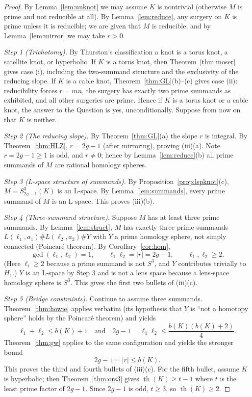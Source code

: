 \documentclass[11pt]{amsart}
\theoremstyle{definition}
\theoremstyle{remark}
\numberwithin{equation}{section}
\begin{document}
\begin{proof}
By Lemma~\ref{lem:unknot} we may assume $K$ is nontrivial (otherwise $M$
is prime and not reducible at all). By Lemma~\ref{lem:reduce}, any
surgery on $K$ is prime unless it is reducible; we are given that $M$ is
reducible, and by Lemma~\ref{lem:mirror} we may take $r>0$.

\noindent\emph{Step 1 (Trichotomy).} By Thurston's classification a knot
is a torus knot, a satellite knot, or hyperbolic. If $K$ is a torus knot,
then Theorem~\ref{thm:moser} gives case (i), including the two-summand
structure and the exclusivity of the reducing slope. If $K$ is a cable
knot, Theorem~\ref{thm:GL}(b)--(c) gives case (ii): reducibility forces
$r=mn$, the surgery has exactly two prime summands as exhibited, and all
other surgeries are prime. Hence if $K$ is a torus knot or a cable knot,
the answer to the Question is yes, unconditionally. Suppose from now on
that $K$ is neither.

\noindent\emph{Step 2 (The reducing slope).} By
Theorem~\ref{thm:GL}(a) the slope $r$ is integral. By
Theorem~\ref{thm:HLZ}, $r=2g-1$ (after mirroring), proving (iii)(a). Note
$r=2g-1\ge1$ is odd, and $r\neq0$; hence by
Lemma~\ref{lem:reduce}(b) all prime summands of $M$ are rational homology
spheres.

\noindent\emph{Step 3 (L-space structure of summands).} By
Proposition~\ref{prop:lspknot}(c), $M=S^{3}_{2g-1}(K)$ is an L-space. By
Lemma~\ref{lem:summands}, every prime summand of $M$ is an L-space. This
proves (iii)(b).

\noindent\emph{Step 4 (Three-summand structure).} Suppose $M$ has at
least three prime summands. By Lemma~\ref{lem:struct}, $M$ has exactly
three prime summands
$L(\ell_{1},a_{1})\#L(\ell_{2},a_{2})\#Y$ with $Y$ a prime homology
sphere, not simply connected (Poincar\'e theorem). By
Corollary~\ref{cor:hom},
\[
\gcd(\ell_{1},\ell_{2})=1,\qquad
\ell_{1}\ell_{2}=|r|=2g-1,\qquad \ell_{1},\ell_{2}\ge2 .
\]
(Here $\ell_{i}\ge2$ because a prime summand is not $S^{3}$, and $Y$
contributes trivially to $H_{1}$.) $Y$ is an L-space by Step 3 and is not
a lens space because a lens-space homology sphere is $S^{3}$. This gives
the first two bullets of (iii)(c).

\noindent\emph{Step 5 (Bridge constraints).} Continue to assume three
summands. Theorem~\ref{thm:howie} applies verbatim (its hypothesis that
$Y$ is ``not a homotopy sphere'' holds by the Poincar\'e theorem) and
yields
\[
\ell_{1}+\ell_{2}\le b(K)+1
\quad\text{and}\quad
2g-1=\ell_{1}\ell_{2}\le\frac{b(K)(b(K)+2)}{4}.
\]
Theorem~\ref{thm:gw} applies to the same configuration and yields the
stronger bound
\[
2g-1=|r|\le b(K).
\]
This proves the third and fourth bullets of (iii)(c). For the fifth
bullet, assume $K$ is hyperbolic; then Theorem~\ref{thm:ors3} gives
$\operatorname{th}(K)\ge t-1$ where $t$ is the least prime factor of
$2g-1$. Since $2g-1$ is odd, $t\ge3$, so $\operatorname{th}(K)\ge2$.


\end{proof}
\end{document}
